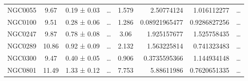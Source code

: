 \documentclass[reprint,%
 amsmath,amssymb,
 aps,
]{revtex4-1}
\begin{document}
\begin{table}[]
\begin{tabular}{cccccrrc}
\rowcolor[HTML]{F3F3F3} 
NGC0055              & 9.67                      & 0.19 ± 0.03           & …                      & 1.579                                                        & 2.50774124                                                            & 1.016112277                                                           & …                                                             \\
\rowcolor[HTML]{F3F3F3} 
NGC0100              & 9.51                      & 0.28 ± 0.06           & …                      & 1.286                                                        & 0.08921965477                                                         & 0.9286827256                                                          & …                                                             \\
\rowcolor[HTML]{F3F3F3} 
NGC0247              & 9.87                      & 0.78 ± 0.08           & …                      & 3.06                                                         & 1.925157677                                                           & 1.525758435                                                           & …                                                             \\
\rowcolor[HTML]{F3F3F3} 
NGC0289              & 10.86                     & 0.92 ± 0.09           & …                      & 2.132                                                        & 1.563225814                                                           & 0.741323483                                                           & …                                                             \\
\rowcolor[HTML]{F3F3F3} 
NGC0300              & 9.47                      & 0.40 ± 0.05           & …                      & 0.906                                                        & 0.3735595366                                                          & 1.144934148                                                           & …                                                             \\
\rowcolor[HTML]{F3F3F3} 
NGC0801              & 11.49                     & 1.33 ± 0.12           & …                      & 7.753                                                        & 5.88611986                                                            & 0.7620651335                                                          & …                                                             \\

\end{tabular}
\end{table}
\end{document}
